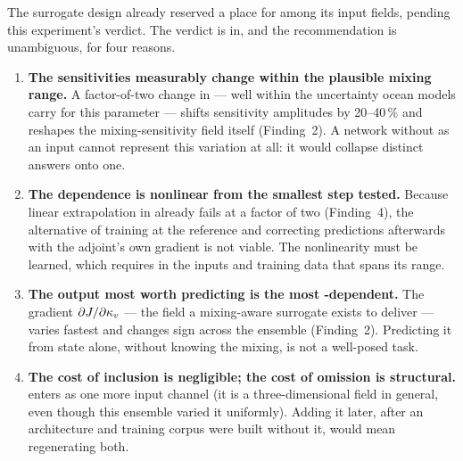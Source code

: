The surrogate design already reserved a place for \kv{} among its input
fields, pending this experiment's verdict. The verdict is in, and the
recommendation is unambiguous, for four reasons.

\begin{enumerate}[nosep,leftmargin=1.6em]
  \item \textbf{The sensitivities measurably change within the plausible
        mixing range.} A factor-of-two change in \kv{} --- well within the
        uncertainty ocean models carry for this parameter --- shifts
        sensitivity amplitudes by 20--40\,\% and reshapes the
        mixing-sensitivity field itself (Finding~2). A network without \kv{}
        as an input cannot represent this variation at all: it would collapse
        distinct answers onto one.
  \item \textbf{The dependence is nonlinear from the smallest step tested.}
        Because linear extrapolation in \kv{} already fails at a factor of two
        (Finding~4), the alternative of training at the reference and
        correcting predictions afterwards with the adjoint's own gradient is
        not viable. The nonlinearity must be learned, which requires \kv{}
        in the inputs and training data that spans its range.
  \item \textbf{The output most worth predicting is the most
        \kv-dependent.} The gradient $\partial J/\partial\kappa_{v}$ --- the field a
        mixing-aware surrogate exists to deliver --- varies fastest and
        changes sign across the ensemble (Finding~2). Predicting it from
        state alone, without knowing the mixing, is not a well-posed task.
  \item \textbf{The cost of inclusion is negligible; the cost of omission is
        structural.} \kv{} enters as one more input channel (it is a
        three-dimensional field in general, even though this ensemble varied
        it uniformly). Adding it later, after an architecture and training
        corpus were built without it, would mean regenerating both.
\end{enumerate}

